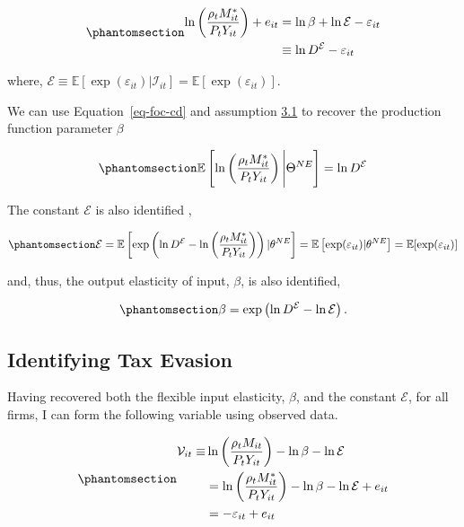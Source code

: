\documentclass[
  12pt]{article}
\theoremstyle{definition}
\theoremstyle{remark}
\begin{document}
\begin{equation}\phantomsection\label{eq-foc-cd}{
\begin{aligned}
    \ln\left(\frac{\rho_t M^*_{it}}{P_{t}Y_{it}}\right)+e_{it}&=\ln\beta + \ln \mathcal{E}- \varepsilon_{it} \\
    &\equiv \ln D^{\mathcal{E}}- \varepsilon_{it} 
\end{aligned}
}\end{equation}

where,
\(\mathcal{E}\equiv \mathbb{E}[\exp(\varepsilon_{it})|\mathcal{I}_{it}]=\mathbb{E}[\exp(\varepsilon_{it})]\).

We can use Equation~\ref{eq-foc-cd} and assumption
\hyperref[ass-non-ev]{3.1} to recover the production function parameter
\(\beta\)

\begin{equation}\phantomsection\label{eq-foc-cd-exp}{
    \mathbb{E}\left[\ln\left(\frac{\rho_t M^*_{it}}{P_{t}Y_{it}}\right)\Bigg| \Theta^{NE}\right]=\ln D^{\mathcal{E}}
}\end{equation}

The constant \(\mathcal{E}\) is also identified \citep{Gandhi2020},

\begin{equation}\phantomsection\label{eq-id-E}{
\mathcal{E}=\mathbb{E}\left[\exp\left(\ln D^{\mathcal{E}}- \ln\left(\frac{\rho_t M^*_{it}}{P_{t}Y_{it}}\right)\right)|\theta^{NE}\right]=\mathbb{E}\left[\exp(\varepsilon_{it})|\theta^{NE}\right]=\mathbb{E}[\exp(\varepsilon_{it})]
}\end{equation}

and, thus, the output elasticity of input, \(\beta\), is also
identified,

\begin{equation}\phantomsection\label{eq-id-beta}{
\beta=\exp\left(\ln D^{\mathcal{E}}-\ln\mathcal{E}\right).
}\end{equation}

\subsection{Identifying Tax Evasion}\label{identifying-tax-evasion}

Having recovered both the flexible input elasticity, \(\beta\), and the
constant \(\mathcal{E}\), for all firms, I can form the following
variable using observed data.

\begin{equation}\phantomsection\label{eq-ob-ev}{
\begin{aligned}
    \mathcal V_{it}\equiv&\ln\left(\frac{\rho_t M_{it}}{P_{t}Y_{it}}\right)-\ln\beta -\ln\mathcal{E}\notag \\
    &=\ln\left(\frac{\rho_tM^*_{it}}{P_{t}Y_{it}}\right)-\ln\beta-\ln\mathcal{E}+e_{it} \notag \\
    &=-\varepsilon_{it} +e_{it}
\end{aligned}
}\end{equation}
\end{document}
